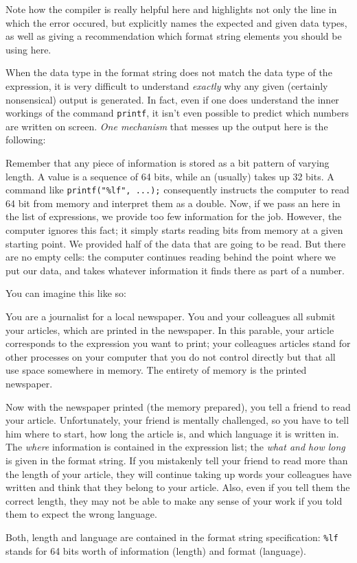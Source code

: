 \begin{warnbox}
Note how the compiler is really helpful here and highlights not only the line in which the error occured, but explicitly names the expected and given data types, as well as giving a recommendation which format string elements you should be using here.
\end{warnbox}

\begin{plusbox}
When the data type in the format string does not match the data type of the expression, it is very difficult to understand \emph{exactly} why any given (certainly nonsensical) output is generated. In fact, even if one does understand the inner workings of the command \texttt{printf}, it isn't even possible to predict which numbers are written on screen. \emph{One mechanism} that messes up the output here is the following:

Remember that any piece of information is stored as a bit pattern of varying length. A  value is a sequence of 64 bits, while an  (usually) takes up 32 bits. A command like \texttt{printf("\%lf", ...);} consequently instructs the computer to read 64 bit from memory and interpret them as a double. Now, if we pass an  here in the list of expressions, we provide too few information for the job. However, the computer ignores this fact; it simply starts reading bits from memory at a given starting point. We provided half of the data that are going to be read. But there are no empty cells: the computer continues reading behind the point where we put our data, and takes whatever information it finds there as part of a  
number.

You can imagine this like so:

You are a journalist for a local newspaper. You and your colleagues all submit your articles, which are printed in the newspaper. In this parable, your article corresponds to the expression you want to print; your colleagues articles stand for other processes on your computer that you do not control directly but that all use space somewhere in memory. The entirety of memory is the printed newspaper.

Now with the newspaper printed (the memory prepared), you tell a friend to read your article. Unfortunately, your friend is mentally challenged, so you have to tell him where to start, how long the article is, and which language it is written in. The \emph{where} information is contained in the expression list; the \emph{what and how long} is given in the format string. If you mistakenly tell your friend to read more than the length of your article, they will continue taking up words your colleagues have written and think that they belong to your article. Also, even if you tell them the correct length, they may not be able to make any sense of your work if you told them to expect the wrong language.

Both, length and language are contained in the format string specification: \texttt{\%lf} stands for 64 bits worth of information (length) and  format (language).
\end{plusbox}

